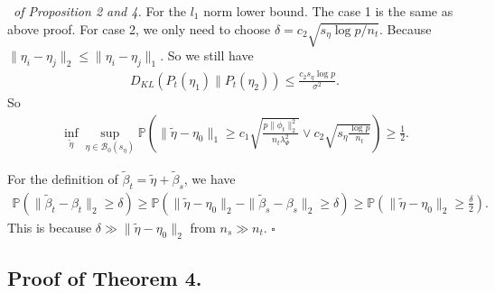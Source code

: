 \documentclass[12pt]{article}
\newenvironment{pf}{{\noindent \it Proof}\ }{\hfill $\square$\par}
\begin{document}
\begin{pf}{\it of Proposition 2 and 4. }
    For the $l_1$ norm lower bound. The case 1 is the same as above proof. For case 2, we only need to choose $\delta = c_2\sqrt{s_\eta \log p/n_t}$. Because $\|\eta_i-\eta_j\|_2 \le  \|\eta_i-\eta_j\|_1$. So we still have 
    \begin{align*}
        D_{KL}(P_t(\eta_1)\|P_t(\eta_2)) \le \frac{c_2s_\eta \log p}{\sigma^2}. 
    \end{align*}
    So
    \begin{align*}
        \inf_{\tilde{\eta}}\sup
        _{\eta\in \mathcal{B}_0(s_\eta)}\mathbb{P}\left(\|\tilde{\eta}-\eta_0\|_1 \ge c_1 \sqrt{\frac{p\|\phi_t\|_2^2}{n_t\lambda_\Psi^2}} \vee c_2\sqrt{s_\eta\frac{\log p}{n_t}}\right) \ge \frac{1}{2}.
    \end{align*}

    For the definition of $\tilde{\beta}_t = \tilde{\eta} + \tilde{\beta}_s$, we have
    \begin{align*}
        \mathbb{P}\left(\|\tilde{\beta}_t - \beta_t\|_2 \ge \delta \right) \ge \mathbb{P} \left(\|\tilde{\eta} - \eta_0\|_2 - \|\tilde{\beta}_s - \beta_s\|_2 \ge \delta \right) \ge \mathbb{P}\left(\|\tilde{\eta} - \eta_0\|_2\ge \frac{\delta}{2}\right). 
    \end{align*}
    This is because $\delta \gg \|\tilde{\eta} - \eta_0\|_2$ from $n_s\gg n_t$. 
\end{pf}


\subsection{Proof of Theorem 4. }
\end{document}
